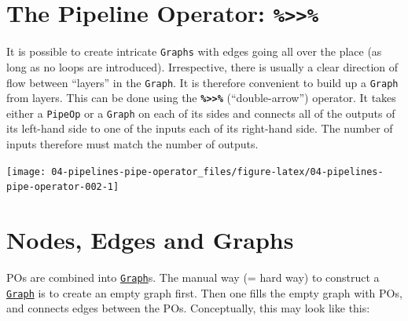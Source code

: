 \documentclass[]{scrbook}
\newenvironment{Shaded}{\begin{snugshade}}{\end{snugshade}}
\newcommand{\DataTypeTok}[1]{\textcolor[rgb]{0.13,0.29,0.53}{#1}}
\newcommand{\KeywordTok}[1]{\textcolor[rgb]{0.13,0.29,0.53}{\textbf{#1}}}
\newcommand{\NormalTok}[1]{#1}
\newcommand{\OperatorTok}[1]{\textcolor[rgb]{0.81,0.36,0.00}{\textbf{#1}}}
\newcommand{\OtherTok}[1]{\textcolor[rgb]{0.56,0.35,0.01}{#1}}
\newcommand{\StringTok}[1]{\textcolor[rgb]{0.31,0.60,0.02}{#1}}
\renewenvironment{Shaded} {\begin{snugshade}\small} {\end{snugshade}}
\begin{document}
\hypertarget{pipe-operator}{%
\section{\texorpdfstring{The Pipeline Operator: \texttt{\%\textgreater{}\textgreater{}\%}}{The Pipeline Operator: \%\textgreater{}\textgreater{}\%}}\label{pipe-operator}}

It is possible to create intricate \texttt{Graphs} with edges going all over the place (as long as no loops are introduced).
Irrespective, there is usually a clear direction of flow between ``layers'' in the \texttt{Graph}.
It is therefore convenient to build up a \texttt{Graph} from layers.
This can be done using the \textbf{\texttt{\%\textgreater{}\textgreater{}\%}} (``double-arrow'') operator.
It takes either a \texttt{PipeOp} or a \texttt{Graph} on each of its sides and connects all of the outputs of its left-hand side to one of the inputs each of its right-hand side.
The number of inputs therefore must match the number of outputs.

\begin{Shaded}
\end{Shaded}

\begin{center}\texttt{[image: 04-pipelines-pipe-operator\_files/figure-latex/04-pipelines-pipe-operator-002-1]} \end{center}

\hypertarget{pipe-nodes-edges-graphs}{%
\section{Nodes, Edges and Graphs}\label{pipe-nodes-edges-graphs}}

POs are combined into \href{https://mlr3pipelines.mlr-org.com/reference/Graph.html}{\texttt{Graph}}s.
The manual way (= hard way) to construct a \href{https://mlr3pipelines.mlr-org.com/reference/Graph.html}{\texttt{Graph}} is to create an empty graph first.
Then one fills the empty graph with POs, and connects edges between the POs.
Conceptually, this may look like this:
\end{document}
